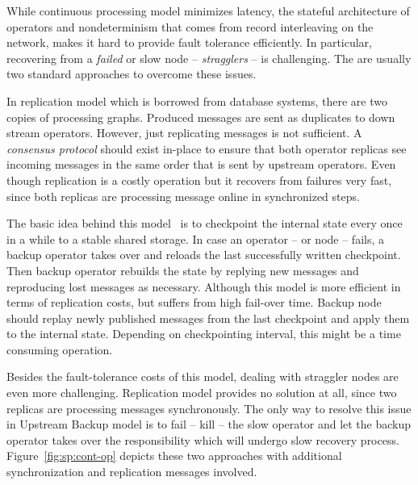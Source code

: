 While continuous processing model minimizes latency, the stateful architecture of operators and nondeterminism that comes from record interleaving on the network, makes it hard to provide fault tolerance efficiently. In particular, recovering from a \emph{failed} or slow node -- \emph{stragglers} -- is challenging. The are usually two standard approaches to overcome these issues.
\begin{description}[leftmargin=0pt]
    \item[Replication] In replication model which is borrowed from database systems, there are two copies of processing graphs. Produced messages are sent as duplicates to down stream operators. However, just replicating messages is not sufficient. A \emph{consensus protocol} should exist in-place to ensure that both operator replicas see incoming messages in the same order that is sent by upstream operators. Even though replication is a costly operation but it recovers from failures very fast, since both replicas are processing message online in synchronized steps.
    \item[Upstream Backup] The basic idea behind this model~\cite{Hwang:2005} is to checkpoint the internal state every once in a while to a stable shared storage. In case an operator -- or node -- fails, a backup operator takes over and reloads the last successfully written checkpoint. Then backup operator rebuilds the state by replying new messages and reproducing lost messages as necessary. Although this model is more efficient in terms of replication costs, but suffers from high fail-over time. Backup node should replay newly published messages from the last checkpoint and apply them to the internal state. Depending on checkpointing interval, this might be a time consuming operation.
\end{description}
Besides the fault-tolerance costs of this model, dealing with straggler nodes are even more challenging. Replication model provides no solution at all, since two replicas are processing messages synchronously. The only way to resolve this issue in Upstream Backup model is to fail -- kill -- the slow operator and let the backup operator takes over the responsibility which will undergo slow recovery process. Figure~\ref{fig:sp:cont-op} depicts these two approaches with additional synchronization and replication messages involved.
